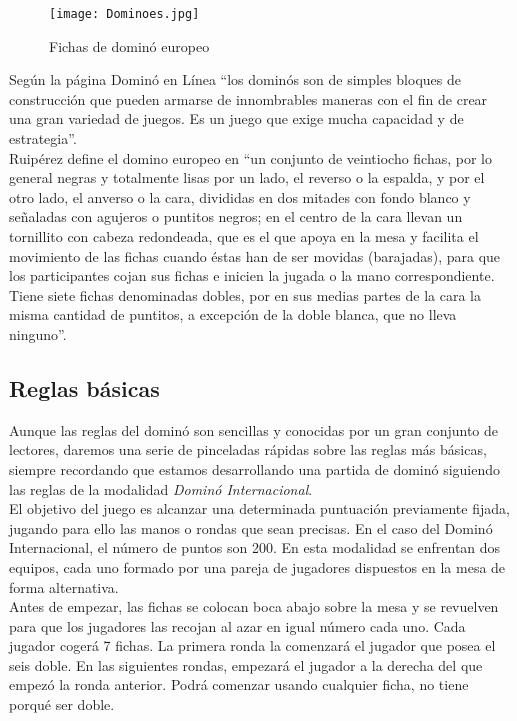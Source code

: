 \begin{figure}[h]
  \begin{center}
    \texttt{[image: Dominoes.jpg]}
  \end{center}
  \caption{Fichas de dominó europeo}
  \label{Dominoes}
\end{figure}

Según la página Dominó en Línea \cite{website:dominoenlinea} “los dominós son de simples bloques de construcción
que pueden armarse de innombrables maneras con el fin de crear una gran variedad de juegos. Es un
juego que exige mucha capacidad y de estrategia”. \\

Ruipérez define el domino europeo en “un conjunto de veintiocho fichas, por lo general negras y
totalmente lisas por un lado, el reverso o la espalda, y por el otro lado, el anverso o la cara,
divididas en dos mitades con fondo blanco y señaladas con agujeros o puntitos negros; en el centro
de la cara llevan un tornillito con cabeza redondeada, que es el que apoya en la mesa y facilita
el movimiento de las fichas cuando éstas han de ser movidas (barajadas), para que los participantes
cojan sus fichas e inicien la jugada o la mano correspondiente. Tiene siete fichas denominadas
dobles, por en sus medias partes de la cara la misma cantidad de puntitos, a excepción de la
doble blanca, que no lleva ninguno”. \\

\subsection{Reglas básicas}

Aunque las reglas del dominó son sencillas y conocidas por un gran conjunto de lectores, daremos una
serie de pinceladas rápidas sobre las reglas más básicas, siempre recordando que estamos desarrollando
una partida de dominó siguiendo las reglas de la modalidad \emph{Dominó Internacional}. \\

El objetivo del juego es alcanzar una determinada puntuación previamente fijada, jugando para ello las
manos o rondas que sean precisas. En el caso del Dominó Internacional, el número de puntos son 200. En esta modalidad se enfrentan dos equipos, cada uno formado por una pareja de jugadores dispuestos en la mesa de forma alternativa. \\

Antes de empezar, las fichas se colocan boca abajo sobre la mesa y se revuelven para que los jugadores
las recojan al azar en igual número cada uno. Cada jugador cogerá 7 fichas. La primera ronda la comenzará
el jugador que posea el seis doble. En las siguientes rondas, empezará el jugador a la derecha del que
empezó la ronda anterior. Podrá comenzar usando cualquier ficha, no tiene porqué ser doble. \\

